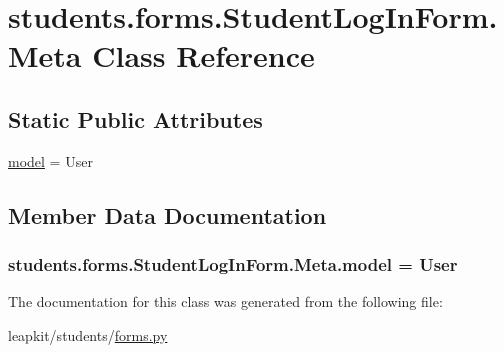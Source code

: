 \hypertarget{classstudents_1_1forms_1_1_student_log_in_form_1_1_meta}{\section{students.\-forms.\-Student\-Log\-In\-Form.\-Meta Class Reference}
\label{classstudents_1_1forms_1_1_student_log_in_form_1_1_meta}
}
\subsection*{Static Public Attributes}
\begin{DoxyCompactItemize}
\item 
\hyperlink{classstudents_1_1forms_1_1_student_log_in_form_1_1_meta_a732bc21f937848e9e78cea8189582acd}{model} = User
\end{DoxyCompactItemize}


\subsection{Member Data Documentation}
\hypertarget{classstudents_1_1forms_1_1_student_log_in_form_1_1_meta_a732bc21f937848e9e78cea8189582acd}{
\subsubsection[{model}]{\setlength{\rightskip}{0pt plus 5cm}students.\-forms.\-Student\-Log\-In\-Form.\-Meta.\-model = User\hspace{0.3cm}{\ttfamily [static]}}}\label{classstudents_1_1forms_1_1_student_log_in_form_1_1_meta_a732bc21f937848e9e78cea8189582acd}


The documentation for this class was generated from the following file\-:\begin{DoxyCompactItemize}
\item 
leapkit/students/\hyperlink{forms_8py}{forms.\-py}\end{DoxyCompactItemize}
